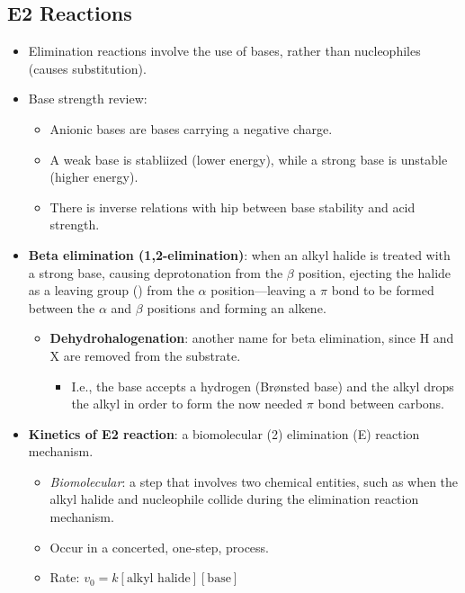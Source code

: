 \documentclass[12pt,a4paper]{article}
\begin{document}
\subsection{E2 Reactions}
\begin{itemize}
    \item Elimination reactions involve the use of {\color{neg}bases}, rather than nucleophiles (causes substitution).
    \item Base strength review:
        \begin{itemize}
            \item {\color{neg}Anionic bases} are bases carrying a negative charge.
            \item A weak base is stabliized (lower energy), while a strong base is unstable (higher energy).
            \item There is inverse relations with hip between base stability and acid strength.
        \end{itemize}
    \item \textbf{Beta elimination (1,2-elimination)}: when an alkyl halide is treated with a {\color{neg}strong base}, causing deprotonation from the $\beta$ position, ejecting the {\color{o-Sun}halide} as a {\color{o-Sun}leaving group} () from the $\alpha$ position---leaving a $\pi$ bond to be formed between the $\alpha$ and $\beta$ positions and forming an {\color{o-Sun}alkene}.
        \begin{itemize}
            \item \textbf{Dehydrohalogenation}: another name for beta elimination, since H and X are removed from the substrate.
                \begin{itemize}
                    \item I.e., the base accepts a hydrogen (Br{\o}nsted base) and the alkyl drops the alkyl in order to form the now needed $\pi$ bond between carbons.
                \end{itemize}
        \end{itemize}
    \item \textbf{Kinetics of E2 reaction}: a biomolecular (2) elimination (E) reaction mechanism.
        \begin{itemize}
            \item \textit{Biomolecular}: a step that involves two chemical entities, such as when the alkyl halide and nucleophile collide during the elimination reaction mechanism. 
            \item Occur in a {\color{o-Sun}concerted}, one-step, process.
            \item Rate: \(v_0 = k[\text{alkyl halide}][\text{base}]\)
        \end{itemize}

\end{itemize}
\end{document}
